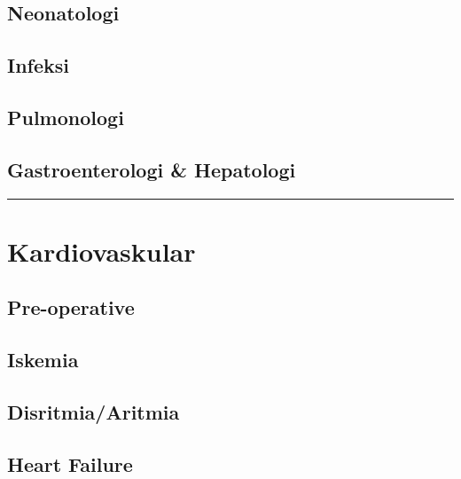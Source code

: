 \documentclass[
]{book}
\begin{document}
\hypertarget{neonatologi}{%
\subsection{Neonatologi}\label{neonatologi}}

\hypertarget{infeksi-2}{%
\subsection{Infeksi}\label{infeksi-2}}

\hypertarget{pulmonologi-1}{%
\subsection{Pulmonologi}\label{pulmonologi-1}}

\hypertarget{gastroenterologi-hepatologi-1}{%
\subsection{Gastroenterologi \& Hepatologi}\label{gastroenterologi-hepatologi-1}}

\begin{center}\rule{0.5\linewidth}{0.5pt}\end{center}

\hypertarget{kardiovaskular-2}{%
\section{Kardiovaskular}\label{kardiovaskular-2}}

\hypertarget{pre-operative}{%
\subsection{Pre-operative}\label{pre-operative}}

\hypertarget{iskemia}{%
\subsection{Iskemia}\label{iskemia}}

\hypertarget{disritmiaaritmia}{%
\subsection{Disritmia/Aritmia}\label{disritmiaaritmia}}

\hypertarget{heart-failure}{%
\subsection{Heart Failure}\label{heart-failure}}
\end{document}
